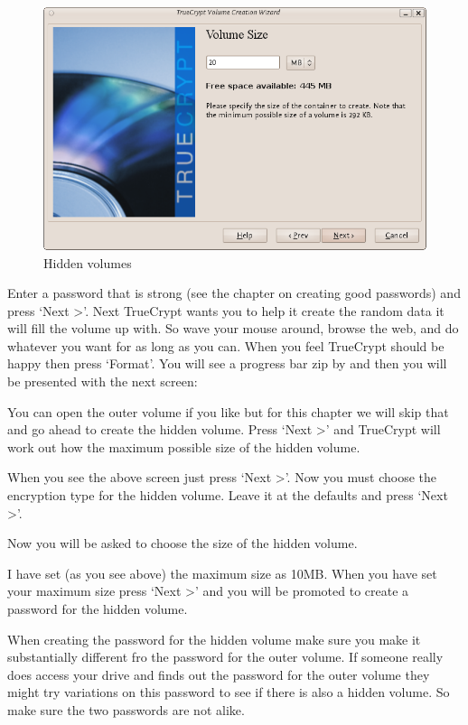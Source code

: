 \begin{figure}[htbp]
\centering
\includegraphics{hidden_vol_006.png}
\caption{Hidden volumes}
\end{figure}

Enter a password that is strong (see the chapter on creating good
passwords) and press `Next \textgreater{}'. Next TrueCrypt wants you to
help it create the random data it will fill the volume up with. So wave
your mouse around, browse the web, and do whatever you want for as long
as you can. When you feel TrueCrypt should be happy then press `Format'.
You will see a progress bar zip by and then you will be presented with
the next screen:

You can open the outer volume if you like but for this chapter we will
skip that and go ahead to create the hidden volume. Press `Next
\textgreater{}' and TrueCrypt will work out how the maximum possible
size of the hidden volume.

When you see the above screen just press `Next \textgreater{}'. Now you
must choose the encryption type for the hidden volume. Leave it at the
defaults and press `Next \textgreater{}'.

Now you will be asked to choose the size of the hidden volume.

I have set (as you see above) the maximum size as 10MB. When you have
set your maximum size press `Next \textgreater{}' and you will be
promoted to create a password for the hidden volume.

When creating the password for the hidden volume make sure you make it
substantially different fro the password for the outer volume. If
someone really does access your drive and finds out the password for the
outer volume they might try variations on this password to see if there
is also a hidden volume. So make sure the two passwords are not alike.

